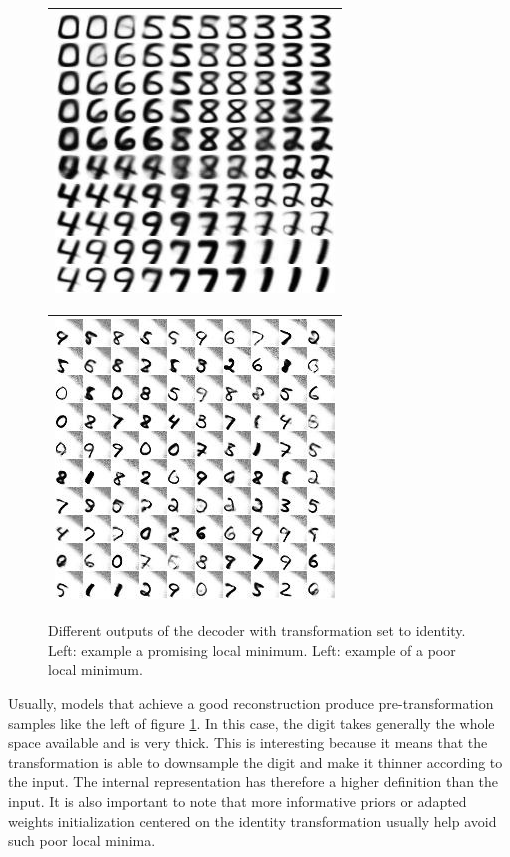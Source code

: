 \documentclass[letterpaper, twoside]{article}
\begin{document}
  \begin{figure}[h]
  \centering
  \begin{minipage}{.33\textwidth}
  \begin{tabular}{|@{}c@{}|}\hline
  \includegraphics[scale=1]{manifold_good_min.jpg}\\ \hline
  \end{tabular}
  \end{minipage}%
  \begin{minipage}{.33\textwidth}
  \begin{tabular}{|@{}c@{}|}\hline
  \includegraphics[scale=1]{manifold_bad_min.jpg}\\\hline
  \end{tabular}
  \end{minipage}%
  \caption{Different outputs of the decoder with transformation set to identity. Left: example a promising local minimum. Left: example of a poor local minimum.}
  \label{locmin}
  \end{figure}

    Usually, models that achieve a good reconstruction produce pre-transformation samples like the left of figure \ref{locmin}. In this case, the digit takes generally the whole space available and is very thick. This is interesting because it means that the transformation is able to downsample the digit and make it thinner according to the input. The internal representation has therefore a higher definition than the input. It is also important to note that more informative priors or adapted weights initialization centered on the identity transformation usually help avoid such poor local minima.
\end{document}
